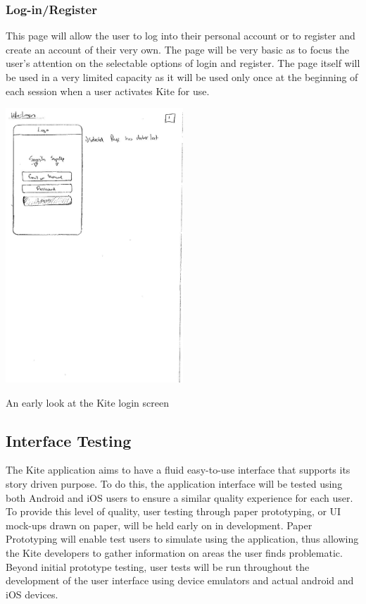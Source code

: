 \documentclass[compsoc, 10, draftclsnofoot, onecolumn]{IEEEtran}
\begin{document}
\subsubsection{Log-in/Register}
This page will allow the user to log into their personal account or to register and create an account of their very own. The page will be very basic as to focus the user's attention on the selectable options of login and register. The page itself will be used in a very limited capacity as it will be used only once at the beginning of each session when a user activates Kite for use.
\begin{center}
\includegraphics[width=0.5\textwidth]{Login}

An early look at the Kite login screen
\end{center}

\subsection{Interface Testing} The Kite application aims to have a fluid easy-to-use interface that supports its story driven purpose. To do this, the application interface will be tested using both Android and iOS users to ensure a similar quality experience for each user. To provide this level of quality, user testing through paper prototyping, or UI mock-ups drawn on paper, will be held early on in development. Paper Prototyping will enable test users to simulate using the application, thus allowing the Kite developers to gather information on areas the user finds problematic. Beyond initial prototype testing, user tests will be run throughout the development of the user interface using device emulators and actual android and iOS devices.
\end{document}
